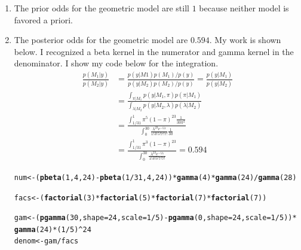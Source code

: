\documentclass[12pt]{article}\usepackage[]{graphicx}\usepackage[]{color}
\makeatletter
\newcommand{\hlnum}[1]{\textcolor[rgb]{0.686,0.059,0.569}{#1}}%
\newcommand{\hlopt}[1]{\textcolor[rgb]{0,0,0}{#1}}%
\newcommand{\hlstd}[1]{\textcolor[rgb]{0.345,0.345,0.345}{#1}}%
\newcommand{\hlkwb}[1]{\textcolor[rgb]{0.69,0.353,0.396}{#1}}%
\newcommand{\hlkwc}[1]{\textcolor[rgb]{0.333,0.667,0.333}{#1}}%
\newcommand{\hlkwd}[1]{\textcolor[rgb]{0.737,0.353,0.396}{\textbf{#1}}}%
\newenvironment{kframe}{%
 \def\at@end@of@kframe{}%
 \ifinner\ifhmode%
  \def\at@end@of@kframe{\end{minipage}}%
  \begin{minipage}{\columnwidth}%
 \fi\fi%
 \def\FrameCommand##1{\hskip\@totalleftmargin \hskip-\fboxsep
 \colorbox{shadecolor}{##1}\hskip-\fboxsep
     \hskip-\linewidth \hskip-\@totalleftmargin \hskip\columnwidth}%
 \MakeFramed {\advance\hsize-\width
   \@totalleftmargin\z@ \linewidth\hsize
   \@setminipage}}%
 {\par\unskip\endMakeFramed%
 \at@end@of@kframe}
\newenvironment{knitrout}{}{} %
\makeatother
\begin{document}
\begin{doublespacing}
\begin{enumerate}
\begin{enumerate}
\begin{enumerate}
\item The prior odds for the geometric model are still $1$ because neither model is favored a priori.

\item The posterior odds for the geometric model are $0.594$. My work is shown below. I recognized a beta kernel in the numerator and gamma kernel in the denominator. I show my code below for the integration. 
\begin{align*}
\frac{p(M_1|y)}{p(M_2|y)} &= \frac{p(y|M1)p(M_1)/p(y)}{p(y|M_2)p(M_2)/p(y)} = \frac{p(y|M_1)}{p(y|M_2)} \\
&= \frac{\int_{\pi|M_1} p(y|M_1, \pi) p(\pi|M_1)}{\int_{\lambda|M_2} p(y|M_2, \lambda) p(\lambda|M_2)} \\
&= \frac{\int_{1/31}^{1} \pi^5 (1-\pi)^{23} \frac{1}{30\pi^2}}{\int_{0}^{30} \frac{\lambda^{23} e^{-5\lambda}}{1!3!5!7!7!} \frac{1}{30}} \\
&= \frac{\int_{1/31}^{1} \pi^3 (1-\pi)^{23}}{\int_{0}^{30} \frac{\lambda^{23} e^{-5\lambda}}{1!3!5!7!7!}} = 0.594
\end{align*}

\begin{singlespace}
\begin{knitrout}\footnotesize
{}\color{fgcolor}\begin{kframe}
\begin{alltt}
\hlstd{num} \hlkwb{<-} \hlstd{(}\hlkwd{pbeta}\hlstd{(}\hlnum{1}\hlstd{,}\hlnum{4}\hlstd{,}\hlnum{24}\hlstd{)} \hlopt{-} \hlkwd{pbeta}\hlstd{(}\hlnum{1}\hlopt{/}\hlnum{31}\hlstd{,} \hlnum{4}\hlstd{,} \hlnum{24}\hlstd{))}\hlopt{*}\hlkwd{gamma}\hlstd{(}\hlnum{4}\hlstd{)}\hlopt{*}\hlkwd{gamma}\hlstd{(}\hlnum{24}\hlstd{)}\hlopt{/}\hlkwd{gamma}\hlstd{(}\hlnum{28}\hlstd{)}

\hlstd{facs} \hlkwb{<-} \hlstd{(}\hlkwd{factorial}\hlstd{(}\hlnum{3}\hlstd{)}\hlopt{*}\hlkwd{factorial}\hlstd{(}\hlnum{5}\hlstd{)}\hlopt{*}\hlkwd{factorial}\hlstd{(}\hlnum{7}\hlstd{)}\hlopt{*}\hlkwd{factorial}\hlstd{(}\hlnum{7}\hlstd{))}

\hlstd{gam} \hlkwb{<-} \hlstd{(}\hlkwd{pgamma}\hlstd{(}\hlnum{30}\hlstd{,} \hlkwc{shape} \hlstd{=} \hlnum{24}\hlstd{,} \hlkwc{scale} \hlstd{=} \hlnum{1}\hlopt{/}\hlnum{5}\hlstd{)} \hlopt{-} \hlkwd{pgamma}\hlstd{(}\hlnum{0}\hlstd{,} \hlkwc{shape} \hlstd{=} \hlnum{24}\hlstd{,} \hlkwc{scale} \hlstd{=} \hlnum{1}\hlopt{/}\hlnum{5}\hlstd{))}\hlopt{*}
  \hlkwd{gamma}\hlstd{(}\hlnum{24}\hlstd{)}\hlopt{*}\hlstd{(}\hlnum{1}\hlopt{/}\hlnum{5}\hlstd{)}\hlopt{^}\hlnum{24}
\hlstd{denom} \hlkwb{<-} \hlstd{gam}\hlopt{/}\hlstd{facs}


\end{alltt}
\end{kframe}
\end{knitrout}
\end{singlespace}
\end{enumerate}
\end{enumerate}
\end{enumerate}
\end{doublespacing}
\end{document}
